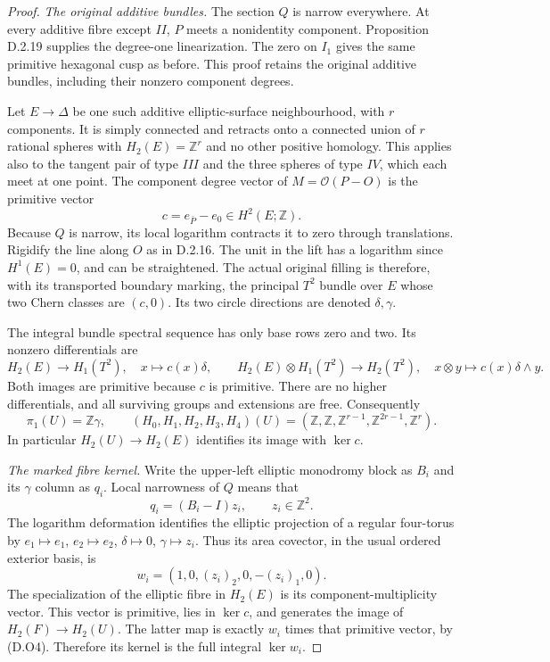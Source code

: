 \begin{proof}
\emph{The original additive bundles.}
The section $Q$ is narrow everywhere. At every additive
fibre except $II$, $P$ meets a nonidentity component.
Proposition D.2.19 supplies the degree-one linearization.
The zero on $I_1$ gives the same primitive hexagonal
cusp as before. This proof retains the original additive
bundles, including their nonzero component degrees.

Let $E\to\Delta$ be one such additive elliptic-surface
neighbourhood, with $r$ components. It is simply connected
and retracts onto a connected union of $r$ rational spheres
with $H_2(E)=\mathbb Z^r$ and no other positive homology.
This applies also to the tangent pair of type $III$ and
the three spheres of type $IV$, which each meet at one
point. The component degree vector of $M=\mathcal O(P-O)$
is the primitive vector
\[
                   c=e_{\bar P}-e_0\in H^2(E;\mathbb Z).
\]
Because $Q$ is narrow, its local logarithm contracts it
to zero through translations. Rigidify the line along
$O$ as in D.2.16. The unit in the lift has a logarithm
since $H^1(E)=0$, and can be straightened. The actual
original filling is therefore, with its transported
boundary marking, the principal $T^2$ bundle over $E$
whose two Chern classes are $(c,0)$. Its two circle
directions are denoted $\delta,\gamma$.

The integral bundle spectral sequence has only base
rows zero and two. Its nonzero differentials are
\[
 H_2(E)\longrightarrow H_1(T^2),\quad x\longmapsto c(x)\delta,
 \qquad
 H_2(E)\otimes H_1(T^2)\longrightarrow H_2(T^2),\quad
 x\otimes y\longmapsto c(x)\delta\wedge y.
\]
Both images are primitive because $c$ is primitive.
There are no higher differentials, and all surviving
groups and extensions are free. Consequently
\[
 \pi_1(U)=\mathbb Z\gamma,\qquad
 (H_0,H_1,H_2,H_3,H_4)(U)
  =(\mathbb Z,\mathbb Z,\mathbb Z^{r-1},
                             \mathbb Z^{2r-1},\mathbb Z^r).
 \tag{D.O4}
\]
In particular $H_2(U)\to H_2(E)$ identifies its image
with $\ker c$.

\emph{The marked fibre kernel.}
Write the upper-left elliptic monodromy block as $B_i$
and its $\gamma$ column as $q_i$. Local narrowness of $Q$
means that
\[
                 q_i=(B_i-I)z_i,\qquad z_i\in\mathbb Z^2.
\]
The logarithm deformation identifies the elliptic
projection of a regular four-torus by
$e_1\mapsto e_1$, $e_2\mapsto e_2$, $\delta\mapsto0$,
$\gamma\mapsto z_i$. Thus its area covector, in the
usual ordered exterior basis, is
\[
           w_i=(1,0,(z_i)_2,0,-(z_i)_1,0).
 \tag{D.O5}
\]
The specialization of the elliptic fibre in $H_2(E)$
is its component-multiplicity vector. This vector is
primitive, lies in $\ker c$, and generates the image
of $H_2(F)\to H_2(U)$. The latter map is exactly
$w_i$ times that primitive vector, by (D.O4).
Therefore its kernel is the full integral $\ker w_i$.


\end{proof}
